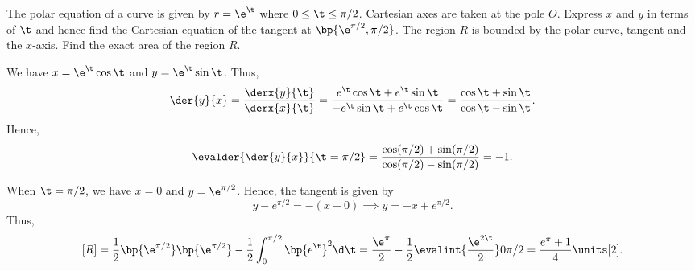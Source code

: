 \begin{problem}
    The polar equation of a curve is given by $r = \e^\t$ where $0 \leq \t \leq \pi/2$. Cartesian axes are taken at the pole $O$. Express $x$ and $y$ in terms of $\t$ and hence find the Cartesian equation of the tangent at $\bp{\e^{\pi/2}, \pi/2}$. The region $R$ is bounded by the polar curve, tangent and the $x$-axis. Find the exact area of the region $R$.
\end{problem}
\begin{solution}
    We have $x = \e^\t \cos \t$ and $y = \e^\t \sin \t$. Thus, \[\der{y}{x} = \frac{\derx{y}{\t}}{\derx{x}{\t}} = \frac{e^\t \cos\t + e^\t\sin\t}{-e^\t \sin\t + e^\t \cos\t} = \frac{\cos\t + \sin\t}{\cos\t - \sin\t}.\] Hence, \[\evalder{\der{y}{x}}{\t = \pi/2} = \frac{\cos(\pi/2) + \sin(\pi/2) }{\cos(\pi/2) - \sin(\pi/2) } = -1.\]

    When $\t = \pi/2$, we have $x = 0$ and $y = \e^{\pi/2}$. Hence, the tangent is given by \[y - e^{\pi/2} = -(x - 0) \implies y = -x + e^{\pi/2}.\] Thus, \[[R] = \frac12 \bp{\e^{\pi/2}}\bp{\e^{\pi/2}} - \frac12 \int_0^{\pi/2} \bp{e^\t}^2 \d \t = \frac{\e^\pi}2 - \frac12 \evalint{\frac{\e^{2\t}}2}0{\pi/2} = \frac{e^\pi + 1}4 \units[2].\]
\end{solution}

